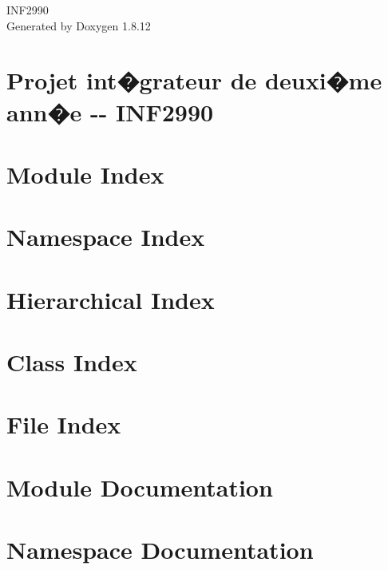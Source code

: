 \documentclass[twoside]{book}
\newcommand{\+}{\discretionary{\mbox{\scriptsize$\hookleftarrow$}}{}{}}
\newcommand{\clearemptydoublepage}{%
  \newpage{\pagestyle{empty}\cleardoublepage}%
}
\begin{document}
\hypersetup{pageanchor=false,
             bookmarksnumbered=true,
             pdfencoding=unicode
            }
\begin{titlepage}
\vspace*{7cm}
\begin{center}%
{\Large I\+N\+F2990 }\\
\vspace*{1cm}
{\large Generated by Doxygen 1.8.12}\\
\end{center}
\end{titlepage}
\clearemptydoublepage
{}
\tableofcontents
\clearemptydoublepage
{}
\hypersetup{pageanchor=true}

\chapter{Projet int�grateur de deuxi�me ann�e -\/-\/ I\+N\+F2990}
\label{index}\hypertarget{index}{}
\chapter{Module Index}

\chapter{Namespace Index}

\chapter{Hierarchical Index}

\chapter{Class Index}

\chapter{File Index}

\chapter{Module Documentation}

\chapter{Namespace Documentation}

\end{document}
